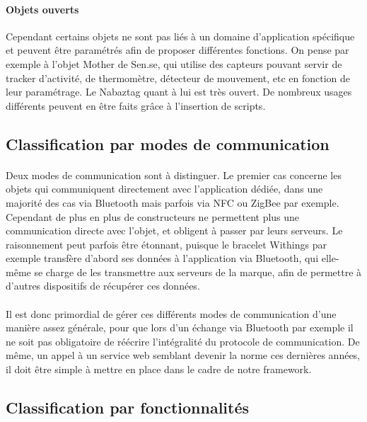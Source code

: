 \documentclass[nocopyrightspace]{sigplanconf}
\begin{document}
		\paragraph{Objets ouverts}
		Cependant certains objets ne sont pas liés à un domaine d’application spécifique et peuvent être paramétrés afin de proposer différentes fonctions. On pense par exemple à l’objet Mother de Sen.se\cite{mother}, qui utilise des capteurs pouvant servir de tracker d’activité, de thermomètre, détecteur de mouvement, etc en fonction de leur paramétrage. Le Nabaztag\cite{karotz} quant à lui est très ouvert. De nombreux usages différents peuvent en être faits grâce à l’insertion de scripts.

	\subsection{Classification par modes de communication}
		\paragraph{}
		Deux modes de communication sont à distinguer. Le premier cas concerne les objets qui communiquent directement avec l'application dédiée, dans une majorité des cas via Bluetooth mais parfois via NFC ou ZigBee par exemple. Cependant de plus en plus de constructeurs ne permettent plus une communication directe avec l'objet, et obligent à passer par leurs serveurs. Le raisonnement peut parfois être étonnant, puisque le bracelet Withings par exemple transfère d'abord ses données à l'application via Bluetooth, qui elle-même se charge de les transmettre aux serveurs de la marque, afin de permettre à d’autres dispositifs de récupérer ces données.

		\paragraph{}
		Il est donc primordial de gérer ces différents modes de communication d'une manière assez générale, pour que lors d'un échange via Bluetooth par exemple il ne soit pas obligatoire de réécrire l'intégralité du protocole de communication. De même, un appel à un service web semblant devenir la norme ces dernières années, il doit être simple à mettre en place dans le cadre de notre framework.

	\subsection{Classification par fonctionnalités}
\end{document}
